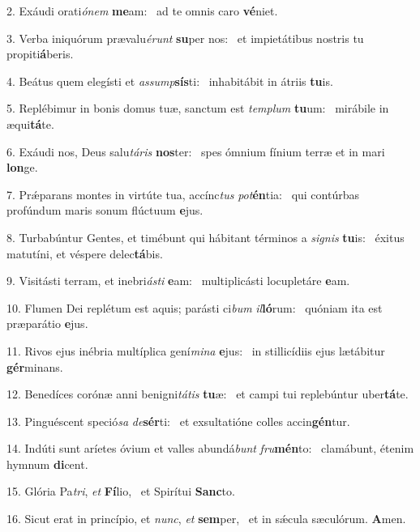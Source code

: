 2. Exáudi orati\textit{ó}\textit{nem} \textbf{me}am: \ast\  ad te omnis caro \textbf{vé}niet.\

3. Verba iniquórum prævalu\textit{é}\textit{runt} \textbf{su}per nos: \ast\  et impietátibus nostris tu propiti\textbf{á}beris.\

4. Beátus quem elegísti et \textit{as}\textit{sump}\textbf{sís}ti: \ast\  inhabitábit in átriis \textbf{tu}is.\

5. Replébimur in bonis domus tuæ, sanctum est \textit{tem}\textit{plum} \textbf{tu}um: \ast\  mirábile in æqui\textbf{tá}te.\

6. Exáudi nos, Deus salu\textit{tá}\textit{ris} \textbf{nos}ter: \ast\  spes ómnium fínium terræ et in mari \textbf{lon}ge.\

7. Prǽparans montes in virtúte tua, accínc\textit{tus} \textit{pot}\textbf{én}tia: \ast\  qui contúrbas profúndum maris sonum flúctuum \textbf{e}jus.\

8. Turbabúntur Gentes, et timébunt qui hábitant términos a \textit{si}\textit{gnis} \textbf{tu}is: \ast\  éxitus matutíni, et véspere delec\textbf{tá}bis.\

9. Visitásti terram, et inebri\textit{ás}\textit{ti} \textbf{e}am: \ast\  multiplicásti locupletáre \textbf{e}am.\

10. Flumen Dei replétum est aquis; parásti ci\textit{bum} \textit{il}\textbf{ló}rum: \ast\  quóniam ita est præparátio \textbf{e}jus.\

11. Rivos ejus inébria multíplica gení\textit{mi}\textit{na} \textbf{e}jus: \ast\  in stillicídiis ejus lætábitur \textbf{gér}minans.\

12. Benedíces corónæ anni benigni\textit{tá}\textit{tis} \textbf{tu}æ: \ast\  et campi tui replebúntur uber\textbf{tá}te.\

13. Pinguéscent speció\textit{sa} \textit{de}\textbf{sér}ti: \ast\  et exsultatióne colles accin\textbf{gén}tur.\

14. Indúti sunt aríetes óvium et valles abundá\textit{bunt} \textit{fru}\textbf{mén}to: \ast\  clamábunt, étenim hymnum \textbf{di}cent.\

15. Glória Pa\textit{tri}, \textit{et} \textbf{Fí}lio, \ast\  et Spirítui \textbf{Sanc}to.\

16. Sicut erat in princípio, et \textit{nunc}, \textit{et} \textbf{sem}per, \ast\  et in sǽcula sæculórum. \textbf{A}men.\

